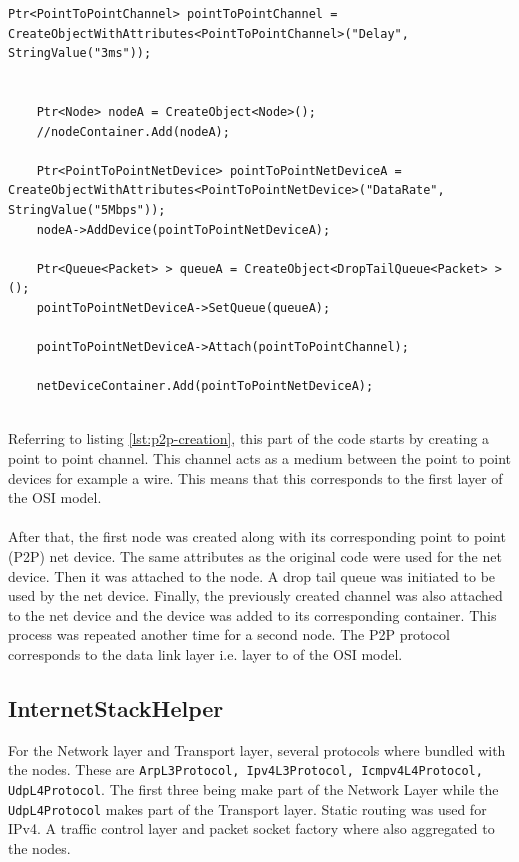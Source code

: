 \documentclass[a4paper, 12pt]{article}
\begin{document}
\begin{lstlisting}[caption=Creating a P2P net device, label=lst:p2p-creation]
	Ptr<PointToPointChannel> pointToPointChannel = CreateObjectWithAttributes<PointToPointChannel>("Delay", StringValue("3ms"));


    Ptr<Node> nodeA = CreateObject<Node>();
    //nodeContainer.Add(nodeA);

    Ptr<PointToPointNetDevice> pointToPointNetDeviceA = CreateObjectWithAttributes<PointToPointNetDevice>("DataRate", StringValue("5Mbps"));
    nodeA->AddDevice(pointToPointNetDeviceA);

    Ptr<Queue<Packet> > queueA = CreateObject<DropTailQueue<Packet> > ();
    pointToPointNetDeviceA->SetQueue(queueA);

    pointToPointNetDeviceA->Attach(pointToPointChannel);

    netDeviceContainer.Add(pointToPointNetDeviceA);


\end{lstlisting}
Referring to listing \ref{lst:p2p-creation}, this part of the code starts by creating a point to point channel. This channel acts as a medium between the point to point devices for example a wire. This means that this corresponds to the first layer of the OSI model. 

\paragraph{}
After that, the first node was created along with its corresponding point to point (P2P) net device. The same attributes as the original code were used for the net device. Then it was attached to the node. A drop tail queue was initiated to be used by the net device. Finally, the previously created channel was also attached to the net device and the device was added to its corresponding container. This process was repeated another time for a second node. The P2P protocol corresponds to the data link layer i.e. layer to of the OSI model.

\subsection{InternetStackHelper}
\label{sec:internetstackhelper}
For the Network layer and Transport layer, several protocols where bundled with the nodes. These are \texttt{ArpL3Protocol, Ipv4L3Protocol, Icmpv4L4Protocol, UdpL4Protocol}. The first three being make part of the Network Layer while the \texttt{UdpL4Protocol} makes part of the Transport layer. Static routing was used for IPv4. A traffic control layer and packet socket factory where also aggregated to the nodes.
\end{document}
